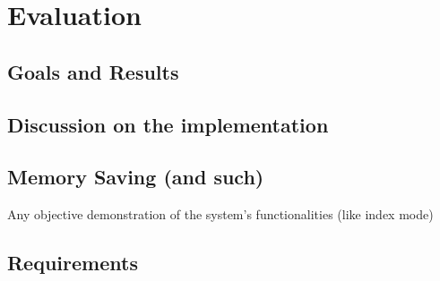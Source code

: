 \chapter{Evaluation}

\section{Goals and Results}

\section{Discussion on the implementation}

\section{Memory Saving (and such)}

Any objective demonstration of the system's functionalities (like index mode)

\section{Requirements}